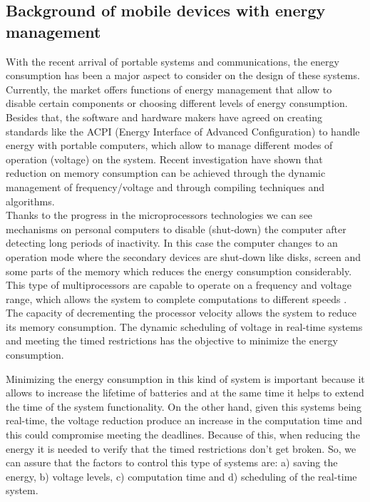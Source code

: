 \documentclass[conference]{IEEEtran}
\begin{document}
 \subsection{Background of mobile devices with energy management}

 With the recent arrival of portable systems and communications, the energy consumption has been a major aspect to consider on the design of these systems. Currently, the market offers functions of energy management that allow to disable certain components or choosing different levels of energy consumption. Besides that, the software and hardware makers have agreed on creating standards like the ACPI (Energy Interface of Advanced Configuration) to handle energy with portable computers, which allow to manage different modes of operation (voltage) on the system. Recent investigation have shown that reduction on memory consumption can be achieved through the dynamic management of frequency/voltage and through compiling techniques and algorithms. \cite{MARGI01} \\
 
 Thanks to the progress in the microprocessors technologies we can see mechanisms on personal computers to disable (shut-down) the computer after detecting long periods of inactivity. In this case the computer changes to an operation mode where the secondary devices are shut-down like disks, screen and some parts of the memory which reduces the energy consumption considerably. This type of multiprocessors are capable to operate on a frequency and voltage range, which allows the system to complete computations to different speeds \cite{PADM01}. The capacity of decrementing the processor velocity allows the system to reduce its memory consumption. The dynamic scheduling of voltage in real-time systems and meeting the timed restrictions has the objective to minimize the energy consumption.

 Minimizing the energy consumption in this kind of system is important because it allows to increase the lifetime of batteries and at the same time it helps to extend the time of the system functionality. On the other hand, given this systems being real-time, the voltage reduction produce an increase in the computation time and this could compromise meeting the deadlines. Because of this, when reducing the energy it is needed to verify that the timed restrictions don't get broken. So, we can assure that the factors to control this type of systems are: a) saving the energy, b) voltage levels, c) computation time and d) scheduling of the real-time system.
 
\end{document}
